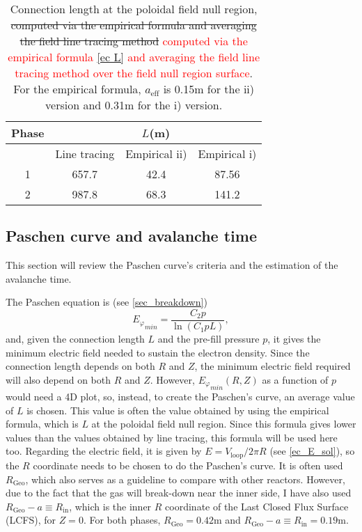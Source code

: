 \documentclass[a4paper,12pt,oneside]{book}
\begin{document}
\begin{table}[htbp]
\centering
	\begin{tabular}{|c|c|c|c|} \hline
Phase	 & \multicolumn{3}{|c|}{$L$(m)} \\ \hline
	& Line tracing & Empirical ii) & Empirical i) \\ \hline 
	1 & 657.7 & 42.4 & 87.56 \\ \hline
	2 & 987.8 & 68.3 & 141.2 \\ \hline
	\end{tabular}
	\caption{Connection length at the poloidal field null region, \st{computed via the empirical formula and averaging the field line tracing method} \textcolor{red}{computed via the empirical formula \eqref{ec L} and averaging the field line tracing method over the field null region surface}. For the empirical formula, $a_\text{eff}$ is 0.15m for the ii) version and 0.31m for the i) version.}
\label{table_L}
\end{table}




\subsection{Paschen curve and avalanche time}

This section will review the Paschen curve's criteria and the estimation of the avalanche time.

The Paschen equation is (see \ref{sec_breakdown})
%
\begin{equation}
{E_\varphi}_{min}=\dfrac{C_2 p}{\ln(C_1 p L)},
\end{equation}
and, given the connection length $L$ and the pre-fill pressure $p$, it gives the minimum electric field needed to sustain the electron density. Since the connection length depends on both $R$ and $Z$, the minimum electric field required will also depend on both $R$ and $Z$. However, ${E_\varphi}_{min}(R,Z)$ as a function of $p$ would need a 4D plot, so, instead, to create the Paschen's curve, an average value of $L$ is chosen. This value is often the value obtained by using the empirical formula, which is $L$ at the poloidal field null region. Since this formula gives lower values than the values obtained by line tracing, this formula will be used here too. Regarding the electric field, it is given by $E=V_\text{loop}/2 \pi R$ (see \eqref{ec_E_sol}), so the $R$ coordinate needs to be chosen to do the Paschen's curve. It is often used $R_\text{Geo}$, which also serves as a guideline to compare with other reactors. However, due to the fact that the gas will break-down near the inner side, I have also used $R_\text{Geo}-a \equiv R_\text{in}$, which is the inner $R$ coordinate of the Last Closed Flux Surface (LCFS), for $Z=0$. For both phases, $R_\text{Geo}=0.42$m and  $R_\text{Geo}-a \equiv R_\text{in}=0.19$m.
\end{document}
